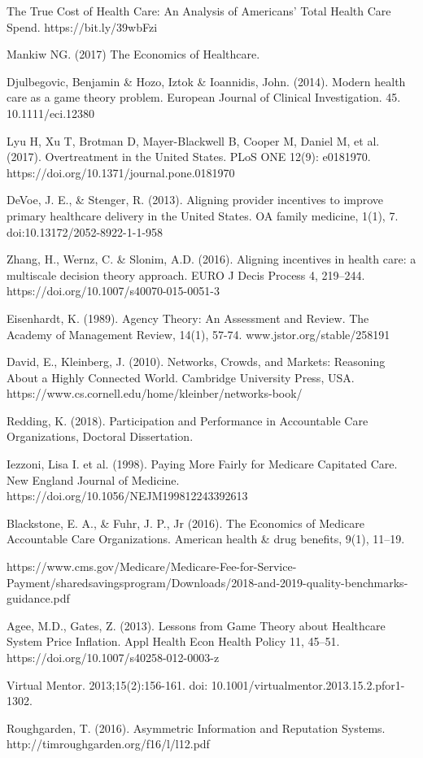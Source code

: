 \documentclass{article}
\begin{document}
\begin{thebibliography}{8}

The True Cost of Health Care: An Analysis of Americans’ Total Health Care Spend. https://bit.ly/39wbFzi

Mankiw NG. (2017) The Economics of Healthcare.

Djulbegovic, Benjamin \& Hozo, Iztok \& Ioannidis, John. (2014). Modern health care as a game theory problem. European Journal of Clinical Investigation. 45. 10.1111/eci.12380

Lyu H, Xu T, Brotman D, Mayer-Blackwell B, Cooper M, Daniel M, et al. (2017). Overtreatment in the United States. PLoS ONE 12(9): e0181970. https://doi.org/10.1371/journal.pone.0181970

DeVoe, J. E., \& Stenger, R. (2013). Aligning provider incentives to improve primary healthcare delivery in the United States. OA family medicine, 1(1), 7. doi:10.13172/2052-8922-1-1-958

Zhang, H., Wernz, C. \& Slonim, A.D. (2016). Aligning incentives in health care: a multiscale decision theory approach. EURO J Decis Process 4, 219–244. https://doi.org/10.1007/s40070-015-0051-3

Eisenhardt, K. (1989). Agency Theory: An Assessment and Review. The Academy of Management Review, 14(1), 57-74. www.jstor.org/stable/258191

David, E., Kleinberg, J. (2010). Networks, Crowds, and Markets: Reasoning About a Highly Connected World. Cambridge University Press, USA. https://www.cs.cornell.edu/home/kleinber/networks-book/

Redding, K. (2018). Participation and Performance in Accountable Care Organizations, Doctoral Dissertation.

Iezzoni, Lisa I. et al. (1998). Paying More Fairly for Medicare Capitated Care. New England Journal of Medicine. https://doi.org/10.1056/NEJM199812243392613

Blackstone, E. A., \& Fuhr, J. P., Jr (2016). The Economics of Medicare Accountable Care Organizations. American health \& drug benefits, 9(1), 11–19.

https://www.cms.gov/Medicare/Medicare-Fee-for-Service-Payment/sharedsavingsprogram/Downloads\-/2018-and-2019-quality-benchmarks-guidance.pdf

Agee, M.D., Gates, Z. (2013). Lessons from Game Theory about Healthcare System Price Inflation. Appl Health Econ Health Policy 11, 45–51. https://doi.org/10.1007/s40258-012-0003-z

Virtual Mentor. 2013;15(2):156-161. doi: 10.1001/virtualmentor.2013.15.2.pfor1-1302.

Roughgarden, T. (2016). Asymmetric Information and Reputation Systems. http://timroughgarden.org/f16/l/l12.pdf

\end{thebibliography}

\end{document}
